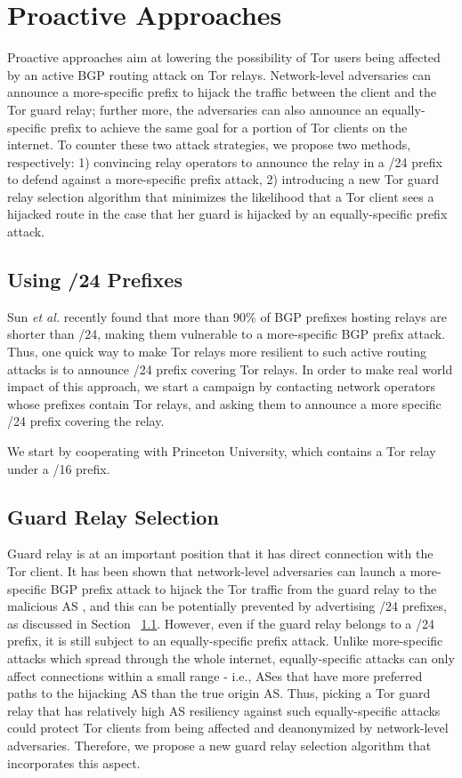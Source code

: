 \section{Proactive Approaches}
Proactive approaches aim at lowering the possibility of Tor users being affected by an active BGP routing attack on Tor relays. Network-level adversaries can announce a more-specific prefix to hijack the traffic between the client and the Tor guard relay; further more, the adversaries can also announce an equally-specific prefix to achieve the same goal for a portion of Tor clients on the internet. To counter these two attack strategies, we propose two methods, respectively: 1) convincing relay operators to announce the relay in a /24 prefix to defend against a more-specific prefix attack, 2) introducing a new Tor guard relay selection algorithm that minimizes the likelihood that a Tor client sees a hijacked route in the case that her guard is hijacked by an equally-specific prefix attack.

\subsection{Using /24 Prefixes}
\label{subsec:24prefix}

Sun \emph{et al.} \cite{sun2015raptor} recently found that more than 90\% of BGP prefixes hosting relays are
shorter than /24, making them vulnerable to a more-specific BGP prefix attack. Thus, one quick way to make Tor relays more resilient to such active routing attacks is to announce /24 prefix covering Tor relays. In order to make real world impact of this approach, we start a campaign by contacting network operators whose prefixes contain Tor relays, and asking them to announce a more specific /24 prefix covering the relay. 

We start by cooperating with Princeton University, which contains a Tor relay under a /16 prefix. 

\subsection{Guard Relay Selection}

Guard relay is at an important position that it has direct connection with the Tor client. It has been shown that network-level adversaries can launch a more-specific BGP prefix attack to hijack the Tor traffic from the guard relay to the malicious AS \cite{sun2015raptor}, and this can be potentially prevented by advertising /24 prefixes, as discussed in Section ~\ref{subsec:24prefix}. However, even if the guard relay belongs to a /24 prefix, it is still subject to an equally-specific prefix attack. Unlike more-specific attacks which spread through the whole internet, equally-specific attacks can only affect connections within a small range - i.e., ASes that have more preferred paths to the hijacking AS than the true origin AS. Thus, picking a Tor guard relay that has relatively high AS resiliency against such equally-specific attacks could protect Tor clients from being affected and deanonymized by network-level adversaries. Therefore, we propose a new guard relay selection algorithm that incorporates this aspect.

